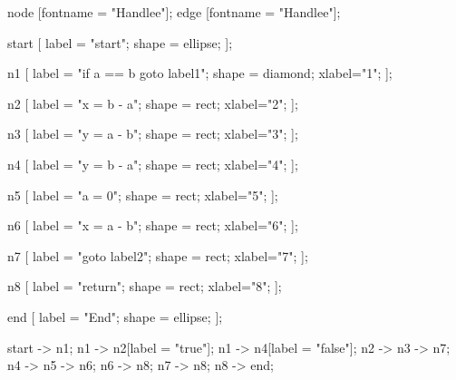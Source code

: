  {
node [fontname = "Handlee"];
edge [fontname = "Handlee"];

start [
 label = "start";
 shape = ellipse; 
];

n1 [
 label = "if a == b goto label1";
 shape = diamond;
 xlabel="1";
];

n2 [
 label = "x = b - a";
 shape = rect;
 xlabel="2";
];

n3 [
 label = "y = a - b";
 shape = rect;
 xlabel="3";
];

n4 [
 label = "y = b - a";
 shape = rect;
 xlabel="4";
];

n5 [
 label = "a = 0";
 shape = rect;
 xlabel="5";
];

n6 [
 label = "x = a - b";
 shape = rect;
 xlabel="6";
];

n7 [
 label = "goto label2";
 shape = rect;
 xlabel="7";
];

n8 [
 label = "return";
 shape = rect;
 xlabel="8";
];

end [
 label = "End";
 shape = ellipse; 
];

start -> n1;
n1 -> n2[label = "true"];
n1 -> n4[label = "false"];
n2 -> n3 -> n7;
n4 -> n5 -> n6;
n6 -> n8;
n7 -> n8;
n8 -> end;

}